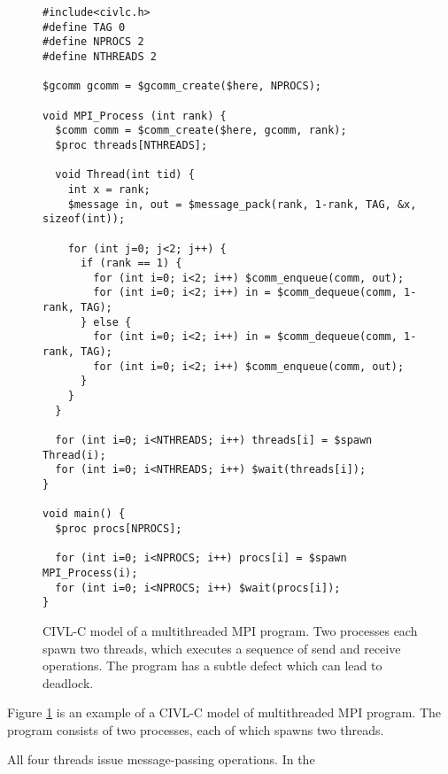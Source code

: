 \begin{figure}[t]
  \begin{small}
\begin{verbatim}
#include<civlc.h>
#define TAG 0
#define NPROCS 2
#define NTHREADS 2

$gcomm gcomm = $gcomm_create($here, NPROCS);

void MPI_Process (int rank) {
  $comm comm = $comm_create($here, gcomm, rank);
  $proc threads[NTHREADS];
  
  void Thread(int tid) {
    int x = rank;
    $message in, out = $message_pack(rank, 1-rank, TAG, &x, sizeof(int));
    
    for (int j=0; j<2; j++) {
      if (rank == 1) {
        for (int i=0; i<2; i++) $comm_enqueue(comm, out);
        for (int i=0; i<2; i++) in = $comm_dequeue(comm, 1-rank, TAG);
      } else {
        for (int i=0; i<2; i++) in = $comm_dequeue(comm, 1-rank, TAG);
        for (int i=0; i<2; i++) $comm_enqueue(comm, out);
      }
    }
  }
  
  for (int i=0; i<NTHREADS; i++) threads[i] = $spawn Thread(i);
  for (int i=0; i<NTHREADS; i++) $wait(threads[i]);
}

void main() {
  $proc procs[NPROCS];

  for (int i=0; i<NPROCS; i++) procs[i] = $spawn MPI_Process(i);
  for (int i=0; i<NPROCS; i++) $wait(procs[i]);
}
\end{verbatim}
  \end{small}
  \caption{CIVL-C model of a multithreaded MPI program.  Two processes
    each spawn two threads, which executes a sequence of send and
    receive operations.  The program has a subtle defect which can
    lead to deadlock.}
  \label{fig:mpithreads}
\end{figure}

Figure \ref{fig:mpithreads} is an example of a CIVL-C model of
multithreaded MPI program.  The program consists of two processes,
each of which spawns two threads.  

All four threads issue
message-passing operations.  In the
